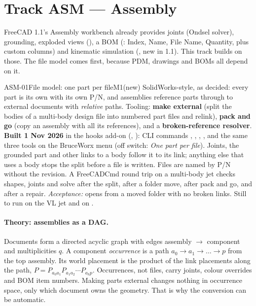 \section{Track ASM --- Assembly}\label{sec:asm}

FreeCAD 1.1's Assembly workbench already provides joints (Ondsel solver), grounding, exploded views
(), a BOM (: Index, Name, File Name, Quantity, plus custom
columns) and kinematic simulation (, new in 1.1). This track builds on
those. The file model comes first, because PDM, drawings and BOMs all depend on it.

\begin{epic}{ASM-01}{File model: one part per file}{M1}{\stProg}{(new)}
SolidWorks-style, as decided: every part is its own  with its own P/N, and assemblies
reference parts through  to external documents with \emph{relative} paths. Tooling:
\textbf{make external} (split the bodies of a multi-body design file into numbered part files and relink),
\textbf{pack and go} (copy an assembly with all its references), and a \textbf{broken-reference resolver}.
\textbf{Built 1 Nov 2026} in the hooks add-on (, ): CLI
commands , , , , and the same three
tools on the BruceWorx menu (off switch: \emph{One part per file}). Joints, the grounded part and other
links to a body follow it to its link; anything else that uses a body stops the split before a file is
written. Files are named by P/N without the revision. A FreeCADCmd round trip on a multi-body jet checks
shapes, joints and solve after the split, after a folder move, after pack and go, and after a repair.
\emph{Acceptance:}  opens from a moved folder with no broken links. Still to run on the
VL jet and on .
\end{epic}

\paragraph{Theory: assemblies as a DAG.} Documents form a directed acyclic graph with edges assembly
$\rightarrow$ component and multiplicities $q$. A component \emph{occurrence} is a path
$a_0\to a_1\to\dots\to p$ from the top assembly. Its world placement is the product of the link placements
along the path, $P = P_{a_0a_1}P_{a_1a_2}\cdots P_{a_kp}$. Occurrences, not files, carry joints, colour
overrides and BOM item numbers. Making parts external changes nothing in occurrence space, only which
document owns the geometry. That is why the conversion can be automatic.

